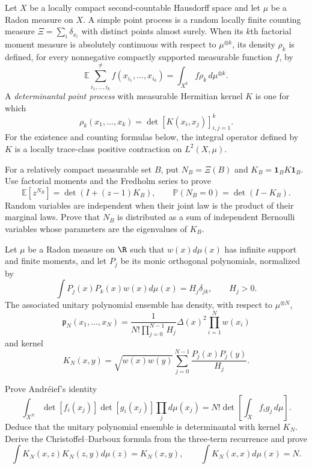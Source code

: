\begin{exercise}
Let $X$ be a locally compact second-countable Hausdorff space and let $\mu$
be a Radon measure on $X$.  A simple point process is a random
locally finite counting measure $\Xi=\sum_i\delta_{x_i}$ with distinct
points almost surely.  When its $k$th factorial moment measure is absolutely
continuous with respect to $\mu^{\otimes k}$, its density $\rho_k$ is
defined, for every nonnegative compactly supported measurable function $f$,
by
\[
\mathbb E\sum_{i_1,\ldots,i_k}^{\ne}
f(x_{i_1},\ldots,x_{i_k})
=\int_{X^k}f\rho_k\,d\mu^{\otimes k}.
\]
A \emph{determinantal point process} with measurable Hermitian kernel $K$
is one for which
\[
\rho_k(x_1,\ldots,x_k)=\det[K(x_i,x_j)]_{i,j=1}^k.
\]
For the existence and counting formulas below, the integral operator defined
by $K$ is a locally trace-class positive contraction on $L^2(X,\mu)$.

For a relatively compact measurable set $B$, put $N_B=\Xi(B)$ and
$K_B=\mathbf1_BK\mathbf1_B$.  Use factorial moments and the Fredholm series
to prove
\[
\mathbb E[z^{N_B}]=\det(I+(z-1)K_B),
\qquad
\mathbb P(N_B=0)=\det(I-K_B).
\]
Random variables are independent when their joint law is the product of
their marginal laws.
Prove that $N_B$ is distributed as a sum of independent Bernoulli variables
whose parameters are the eigenvalues of $K_B$.
\end{exercise}

\begin{exercise}
Let $\mu$ be a Radon measure on $\R$ such that $w(x)d\mu(x)$ has infinite
support and finite moments, and let $P_j$ be its monic orthogonal
polynomials, normalized by
\[
\int P_j(x)P_k(x)w(x)d\mu(x)=H_j\delta_{jk},
\qquad H_j>0.
\]
The associated unitary polynomial ensemble has density, with respect to
$\mu^{\otimes N}$,
\[
\mathfrak p_N(x_1,\ldots,x_N)
=\frac1{N!\prod_{j=0}^{N-1}H_j}
\Delta(x)^2\prod_{i=1}^Nw(x_i)
\]
and kernel
\[
K_N(x,y)=\sqrt{w(x)w(y)}
\sum_{j=0}^{N-1}\frac{P_j(x)P_j(y)}{H_j}.
\]

Prove Andr\'eief's identity
\[
\int_{X^N}\det[f_i(x_j)]\det[g_i(x_j)]\prod_jd\mu(x_j)
=N!\det\!\left[\int_Xf_i g_j\,d\mu\right].
\]
Deduce that the unitary polynomial ensemble is determinantal with kernel
$K_N$.  Derive the Christoffel--Darboux formula from the three-term
recurrence and prove
\[
\int K_N(x,z)K_N(z,y)d\mu(z)=K_N(x,y),
\qquad
\int K_N(x,x)d\mu(x)=N.
\]
\end{exercise}

